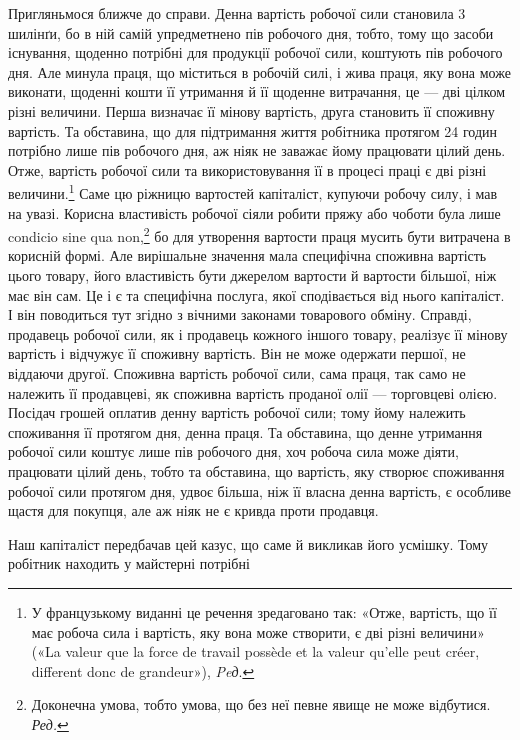 Пригляньмося ближче до справи. Денна вартість робочої
сили становила 3 шилінґи, бо в ній самій упредметнено пів робочого
дня, тобто, тому що засоби існування, щоденно потрібні
для продукції робочої сили, коштують пів робочого дня. Але
минула праця, що міститься в робочій силі, і жива праця, яку
вона може виконати, щоденні кошти її утримання й її щоденне
витрачання, це — дві цілком різні величини. Перша визначає
її мінову вартість, друга становить її споживну вартість. Та
обставина, що для підтримання життя робітника протягом 24 годин
потрібно лише пів робочого дня, аж ніяк не заважає йому
працювати цілий день. Отже, вартість робочої сили та використовування
її в процесі праці є дві різні величини.\footnote*{
У французькому виданні це речення зредаговано так: «Отже, вартість,
що її має робоча сила і вартість, яку вона може створити, є дві різні
величини» («La valeur que la force de travail possède et la valeur qu’elle
peut créer, different donc de grandeur»), \emph{Peд}.
} Саме цю
ріжницю вартостей капіталіст, купуючи робочу силу, і мав на
увазі. Корисна властивість робочої сіяли робити пряжу або чоботи
була лише condicio sine qua non,\footnote*{
Доконечна умова, тобто умова, що без неї певне явище не може відбутися.
\emph{Ред.}
} бо для утворення вартости
праця мусить бути витрачена в корисній формі. Але вирішальне
значення мала специфічна споживна вартість цього товару, його
властивість бути джерелом вартости й вартости більшої, ніж має
він сам. Це і є та специфічна послуга, якої сподівається від нього
капіталіст. І він поводиться тут згідно з вічними законами товарового
обміну. Справді, продавець робочої сили, як і продавець
кожного іншого товару, реалізує її мінову вартість і відчужує її
споживну вартість. Він не може одержати першої, не віддаючи
другої. Споживна вартість робочої сили, сама праця, так само
не належить її продавцеві, як споживна вартість проданої олії —
торговцеві олією. Посідач грошей оплатив денну вартість робочої
сили; тому йому належить споживання її протягом дня, денна
праця. Та обставина, що денне утримання робочої сили коштує
лише пів робочого дня, хоч робоча сила може діяти, працювати
цілий день, тобто та обставина, що вартість, яку створює споживання
робочої сили протягом дня, удвоє більша, ніж її власна
денна вартість, є особливе щастя для покупця, але аж ніяк не
є кривда проти продавця.

Наш капіталіст передбачав цей казус, що саме й викликав
його усмішку. Тому робітник находить у майстерні потрібні
\parbreak{}  %
